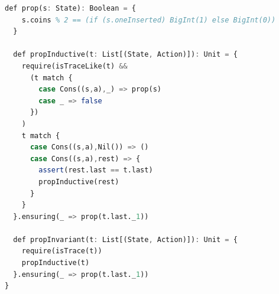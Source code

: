 \documentclass[11pt]{article}
\begin{document}
\begin{lstlisting}[language=Octave]
  def prop(s: State): Boolean = {
    s.coins % 2 == (if (s.oneInserted) BigInt(1) else BigInt(0))
  }

  def propInductive(t: List[(State, Action)]): Unit = {
    require(isTraceLike(t) &&
      (t match {
        case Cons((s,a),_) => prop(s)
        case _ => false
      })
    )
    t match {
      case Cons((s,a),Nil()) => ()
      case Cons((s,a),rest) => {
        assert(rest.last == t.last)
        propInductive(rest)
      }
    }
  }.ensuring(_ => prop(t.last._1))

  def propInvariant(t: List[(State, Action)]): Unit = {
    require(isTrace(t))
    propInductive(t)
  }.ensuring(_ => prop(t.last._1))
}
\end{lstlisting}
\end{document}
